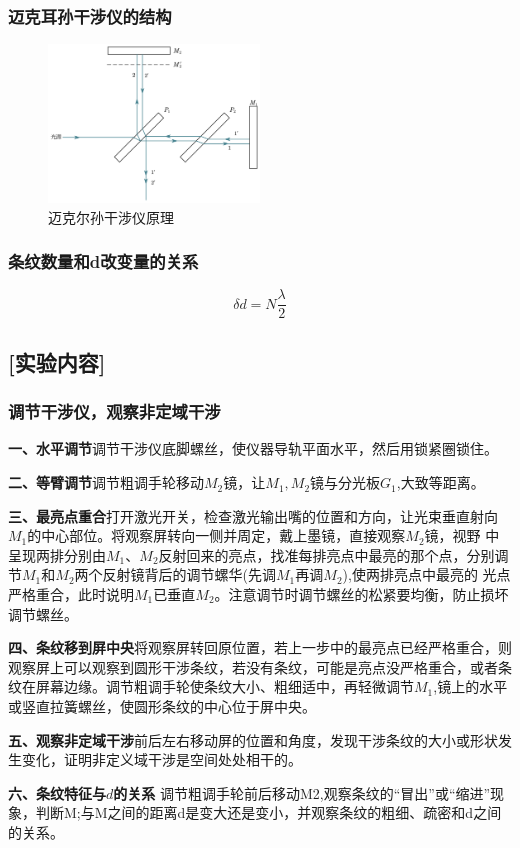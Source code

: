 \documentclass[12pt,a4paper,UTF8]{ctexart}
\begin{document}
\subsubsection*{迈克耳孙干涉仪的结构}
\begin{figure}[!htbp]
	\centering
	\includegraphics[width=0.5\textwidth]{迈克尔干涉仪原理.png}
	\caption{迈克尔孙干涉仪原理}
\end{figure}
\subsubsection*{条纹数量和d改变量的关系}
\[
	\delta d = N\frac{\lambda}{2}
\]
\subsection*{[实验内容]}
\subsubsection*{调节干涉仪，观察非定域干涉}
\par \textbf{一、水平调节}\quad 调节干涉仪底脚螺丝，使仪器导轨平面水平，然后用锁紧圈锁住。
\par \textbf{二、等臂调节}\quad 调节粗调手轮移动$M_2$镜，让$M_1,M_2$镜与分光板$G_1$,大致等距离。
\par \textbf{三、最亮点重合}\quad 打开激光开关，检查激光输出嘴的位置和方向，让光束垂直射向$M_1$的中心部位。将观察屏转向一侧并周定，戴上墨镜，直接观察$M_2$镜，视野 中呈现两排分别由$M_1$、$M_2$反射回来的亮点，找准每排亮点中最亮的那个点，分别调 节$M_1$和$M_2$两个反射镜背后的调节螺华(先调$M_1$再调$M_2$),使两排亮点中最亮的 光点严格重合，此时说明$M_1$已垂直$M_2$。注意调节时调节螺丝的松紧要均衡，防止损坏调节螺丝。
\par \textbf{四、条纹移到屏中央}\quad 将观察屏转回原位置，若上一步中的最亮点已经严格重合，则观察屏上可以观察到圆形干涉条纹，若没有条纹，可能是亮点没严格重合，或者条纹在屏幕边缘。调节粗调手轮使条纹大小、粗细适中，再轻微调节$M_1$,镜上的水平或竖直拉簧螺丝，使圆形条纹的中心位于屏中央。
\par \textbf{五、观察非定域干涉}\quad 前后左右移动屏的位置和角度，发现干涉条纹的大小或形状发生变化，证明非定义域干涉是空间处处相干的。
\par \textbf{六、条纹特征与$d$的关系} \quad 调节粗调手轮前后移动M2,观察条纹的“冒出”或“缩进”现象，判断M;与M之间的距离d是变大还是变小，并观察条纹的粗细、疏密和d之间的关系。
\end{document}
